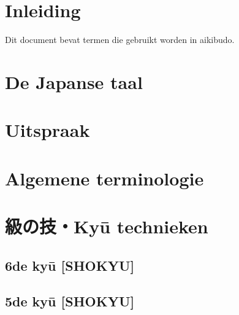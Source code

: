 \documentclass[a4paper, 12pt]{article}
\begin{document}




\newpage


\newpage
\setcounter{page}{1}
\tableofcontents

\newpage
\setcounter{page}{1}

\section{Inleiding}
\noindent Dit document bevat termen die gebruikt worden in aikibudo.

\section{De Japanse taal}


\section{Uitspraak}


\section{Algemene terminologie}


\newpage
\section{級の技・Ky\={u} technieken}
\subsection{6de ky\={u} [SHOKYU]}


\newpage
\subsection{5de ky\={u} [SHOKYU]}

\end{document}
